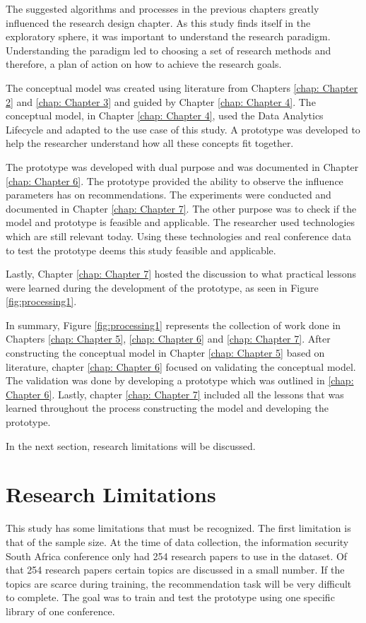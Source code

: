 The suggested algorithms and processes in the previous chapters greatly influenced the research design chapter. As this study finds itself in the exploratory sphere, it was important to understand the research paradigm. Understanding the paradigm led to choosing a set of research methods and therefore, a plan of action on how to achieve the research goals.

The conceptual model was created using literature from Chapters \ref{chap: Chapter 2} and \ref{chap: Chapter 3} and guided by Chapter \ref{chap: Chapter 4}. The conceptual model, in Chapter \ref{chap: Chapter 4}, used the Data Analytics Lifecycle and adapted to the use case of this study. A prototype was developed to help the researcher understand how all these concepts fit together.

The prototype was developed with dual purpose and was documented in Chapter \ref{chap: Chapter 6}. The prototype provided the ability to observe the influence parameters has on recommendations. The experiments were conducted and documented in Chapter \ref{chap: Chapter 7}. The other purpose was to check if the model and prototype is feasible and applicable. The researcher used technologies which are still relevant today. Using these technologies and real conference data to test the prototype deems this study feasible and applicable.

Lastly, Chapter \ref{chap: Chapter 7} hosted the discussion to what practical lessons were learned during the development of the prototype, as seen in Figure \ref{fig:processing1}. 

In summary, Figure \ref{fig:processing1} represents the collection of work done in Chapters \ref{chap: Chapter 5}, \ref{chap: Chapter 6} and \ref{chap: Chapter 7}. After constructing the conceptual model in Chapter \ref{chap: Chapter 5} based on literature, chapter \ref{chap: Chapter 6} focused on validating the conceptual model. The validation was done by developing a prototype which was outlined in \ref{chap: Chapter 6}. Lastly, chapter \ref{chap: Chapter 7} included all the lessons that was learned throughout the process constructing the model and developing the prototype.

In the next section, research limitations will be discussed.

\section{Research Limitations}
This study has some limitations that must be recognized. The first limitation is that of the sample size. At the time of data collection, the information security South Africa conference only had 254 research papers to use in the dataset. Of that 254 research papers certain topics are discussed in a small number. If the topics are scarce during training, the recommendation task will be very difficult to complete. The goal was to train and test the prototype using one specific library of one conference.

